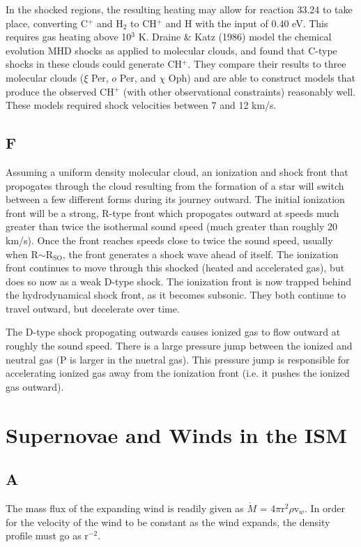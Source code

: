 \documentclass[a4paper]{article}
\begin{document}
In the shocked regions, the resulting heating may allow for reaction 33.24 to take
place, converting C$^+$ and H$_2$ to CH$^+$ and H with the input of 0.40 eV. This
requires gas heating above 10$^3$ K. Draine \& Katz (1986) model the chemical
evolution MHD shocks as applied to molecular clouds, and found that C-type 
shocks in these clouds could generate CH$^+$. They compare their results to 
three molecular clouds ($\xi$ Per, $o$ Per, and $\chi$ Oph) and are able
to construct models that produce the observed CH$^+$ (with other
observational constraints) reasonably well. These models required shock 
velocities between 7 and 12 km/s.

\subsection{F}
Assuming a uniform density molecular cloud, an ionization and shock front that
propogates through the cloud resulting from the formation of a star will switch
between a few different forms during its journey outward. The initial ionization
front will be a strong, R-type front which propogates outward at speeds much
greater than twice the isothermal sound speed (much greater than roughly 20 km/s).
Once the front reaches speeds close to twice the sound speed, usually when 
R$\sim$R$_{\text{SO}}$, the front generates a shock wave ahead of itself. 
The ionization front continues to move through this shocked (heated and 
accelerated gas), but does so now as a weak D-type shock. The ionization front
is now trapped behind the hydrodynamical shock front, as it becomes subsonic.
They both continue to travel outward, but decelerate over time.

The D-type shock propogating outwards causes ionized gas to flow outward
at roughly the sound speed. There is a large pressure jump between the ionized
and neutral gas (P is larger in the nuetral gas). This pressure jump is responsible
for accelerating ionized gas away from the ionization front (i.e. it pushes
the ionized gas outward).


\section{Supernovae and Winds in the ISM}

\subsection{A}
The mass flux of the expanding wind is readily given as
$\dot{M}$ = 4$\pi$r$^{2}\rho$v$_w$. In order for the velocity of the wind to
be constant as the wind expands, the density profile must go as r$^{-2}$.
\end{document}
